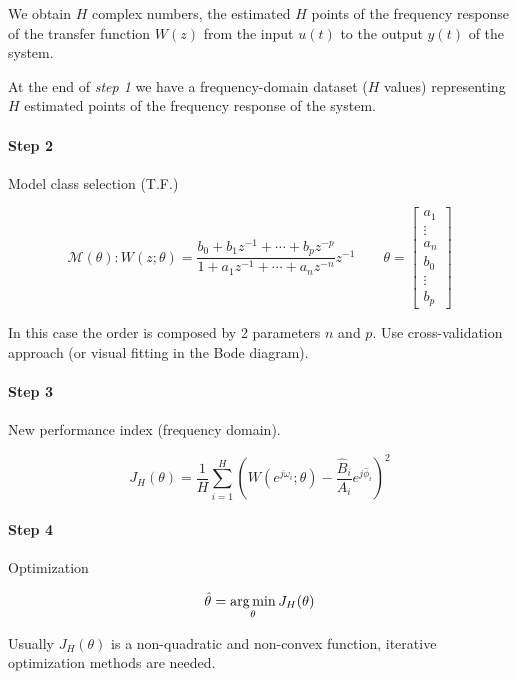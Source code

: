 We obtain $H$ complex numbers, the estimated $H$ points of the frequency response of the transfer function $W(z)$ from the input $u(t)$ to the output $y(t)$ of the system.


At the end of \emph{step 1} we have a frequency-domain dataset ($H$ values) representing $H$ estimated points of the frequency response of the system.

\paragraph{Step 2} Model class selection (T.F.)

\[
    \mathcal{M}(\theta): W(z; \theta) = \frac{b_0+b_1z^{-1}+\cdots+b_pz^{-p}}{1+a_1z^{-1}+\cdots+a_nz^{-n}}z^{-1}
    \qquad
    \theta = \begin{bmatrix}
        a_1 \\ \vdots \\ a_n \\ b_0 \\ \vdots \\ b_p
    \end{bmatrix}
\]

\begin{remark}
    In this case the order is composed by 2 parameters $n$ and $p$.
    Use cross-validation approach (or visual fitting in the Bode diagram).
\end{remark}

\paragraph{Step 3} New performance index (frequency domain).

\[
    J_H(\theta) = \frac{1}{H} \sum_{i=1}^H \left(W(e^{j\omega_i}; \theta) - \frac{\hat{B}_i}{A_i}e^{j\hat{\phi}_i} \right)^2
\]

\paragraph{Step 4} Optimization

\[
    \hat{\theta} = \operatorname*{arg\,min}_\theta J_H(\theta)
\]

Usually $J_H(\theta)$ is a non-quadratic and non-convex function, iterative optimization methods are needed.

